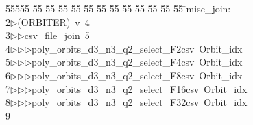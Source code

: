 %
%
\begin{tabbing}
55555 \= 55 \= 55 \= 55 \= 55 \= 55 \= 55 \= 55 \= 55 \= 55 \= 55 \= 55 \= 55 \= \>misc\_join:\\[0pt]
2\>$\triangleright$\>(ORBITER)\ v\ 4\ \\[0pt]
3\>$\triangleright$\>$\triangleright$\>csv\_file\_join\ 5\ \\[0pt]
4\>$\triangleright$\>$\triangleright$\>$\triangleright$\>poly\_orbits\_d3\_n3\_q2\_select\_F2csv\ Orbit\_idx\ \\[0pt]
5\>$\triangleright$\>$\triangleright$\>$\triangleright$\>poly\_orbits\_d3\_n3\_q2\_select\_F4csv\ Orbit\_idx\ \\[0pt]
6\>$\triangleright$\>$\triangleright$\>$\triangleright$\>poly\_orbits\_d3\_n3\_q2\_select\_F8csv\ Orbit\_idx\ \\[0pt]
7\>$\triangleright$\>$\triangleright$\>$\triangleright$\>poly\_orbits\_d3\_n3\_q2\_select\_F16csv\ Orbit\_idx\ \\[0pt]
8\>$\triangleright$\>$\triangleright$\>$\triangleright$\>poly\_orbits\_d3\_n3\_q2\_select\_F32csv\ Orbit\_idx\ \\[0pt]
9\>\end{tabbing}
